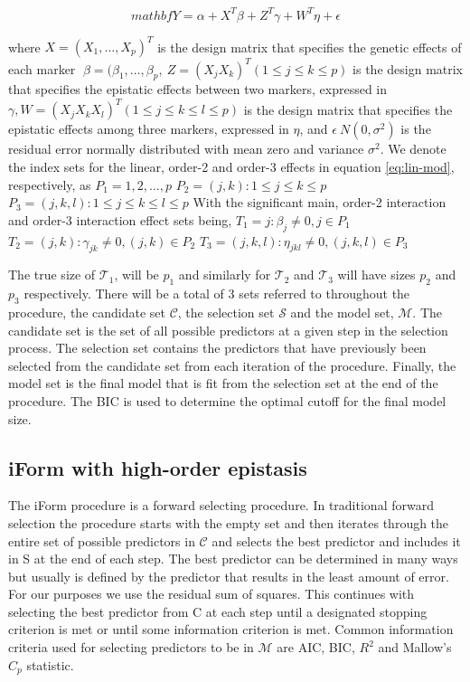\documentclass[11pt,]{book}
\theoremstyle{definition}
\theoremstyle{definition}
\theoremstyle{remark}
\begin{document}
\begin{equation}
mathbf{Y} = \alpha + X^T\beta + Z^T\gamma + W^T\eta + \epsilon
\label{eq:lin-mod}
\end{equation}

where \(X=(X_1,\dots,X_p)^T\) is the design matrix that specifies the
genetic effects of each marker
\(\beta=(\beta_1,\dots,\beta_p,~ Z=(X_jX_k)^T (1 \le j \le k \le p)\)
is the design matrix that specifies the epistatic effects between two
markers, expressed in
\(\gamma, W=(X_j X_k X_l)^T (1 \le j \le k \le l \le p)\) is the design
matrix that specifies the epistatic effects among three markers,
expressed in \(\eta\), and \(\epsilon ~ N(0,\sigma^2 )\) is the residual
error normally distributed with mean zero and variance \(\sigma^2\). We
denote the index sets for the linear, order-2 and order-3 effects in
equation \eqref{eq:lin-mod}, respectively, as \(P_1={1,2,\dots,p}\)
\(P_2={(j,k):1 \le j \le k \le p}\)
\(P_3={(j,k,l):1 \le j \le k \le l \le p}\) With the significant main,
order-2 interaction and order-3 interaction effect sets being,
\(T_1={j:\beta_j \ne 0,j \in P_1}\)
\(T_2={(j,k):\gamma_{jk} \ne 0,(j,k) \in P_2}\)
\(T_3={(j,k,l):\eta_{jkl} \ne 0,(j,k,l) \in P_3}\)

The true size of \(\mathcal{T}_1\), will be \(p_1\) and similarly for
\(\mathcal{T}_2\) and \(\mathcal{T}_3\) will have sizes \(p_2\) and
\(p_3\) respectively. There will be a total of 3 sets referred to
throughout the procedure, the candidate set \(\mathcal{C}\), the
selection set \(\mathcal{S}\) and the model set, \(\mathcal{M}\). The
candidate set is the set of all possible predictors at a given step in
the selection process. The selection set contains the predictors that
have previously been selected from the candidate set from each iteration
of the procedure. Finally, the model set is the final model that is fit
from the selection set at the end of the procedure. The BIC is used to
determine the optimal cutoff for the final model size.

\subsection{iForm with high-order
epistasis}\label{iform-with-high-order-epistasis}

The iForm procedure is a forward selecting procedure. In traditional
forward selection the procedure starts with the empty set and then
iterates through the entire set of possible predictors in
\(\mathcal{C}\) and selects the best predictor and includes it in S at
the end of each step. The best predictor can be determined in many ways
but usually is defined by the predictor that results in the least amount
of error. For our purposes we use the residual sum of squares. This
continues with selecting the best predictor from C at each step until a
designated stopping criterion is met or until some information criterion
is met. Common information criteria used for selecting predictors to be
in \(\mathcal{M}\) are AIC, BIC, \(R^2\) and Mallow's \(C_p\) statistic.
\end{document}
